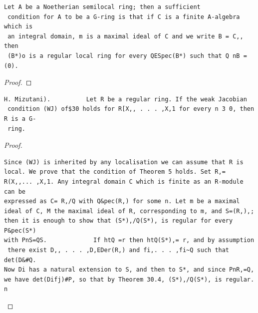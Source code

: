 \begin{theorem}\label{mcrt-auto-theorem-32-5}\uses{}
\begin{verbatim}
Let A be a Noetherian semilocal ring; then a sufficient
 condition for A to be a G-ring is that if C is a finite A-algebra which is
 an integral domain, m is a maximal ideal of C and we write B = C,, then
 (B*)o is a regular local ring for every QESpec(B*) such that Q nB = (0).
\end{verbatim}
\end{theorem}
\begin{proof}
\notready
\end{proof}


\begin{theorem}\label{mcrt-auto-theorem-32-6}\uses{}
\begin{verbatim}
H. Mizutani).          Let R be a regular ring. If the weak Jacobian
 condition (WJ) of$30 holds for R[X,, . . . ,X,1 for every n 3 0, then R is a G-
 ring.
\end{verbatim}
\end{theorem}
\begin{proof}
\begin{verbatim}
Since (WJ) is inherited by any localisation we can assume that R is
local. We prove that the condition of Theorem 5 holds. Set R,=
R(X,,... ,X,1. Any integral domain C which is finite as an R-module can be
expressed as C= R,/Q with Q&pec(R,) for some n. Let m be a maximal
ideal of C, M the maximal ideal of R, corresponding to m, and S=(R,),;
then it is enough to show that (S*),/Q(S*), is regular for every P&pec(S*)
with PnS=QS.             If htQ =r then htQ(S*),= r, and by assumption
 there exist D,, . . . ,D,EDer(R,) and fi,. . . ,fi~Q such that det(D&#Q.
Now Di has a natural extension to S, and then to S*, and since PnR,=Q,
we have det(Difj)#P, so that by Theorem 30.4, (S*),/Q(S*), is regular. n
\end{verbatim}
\end{proof}



